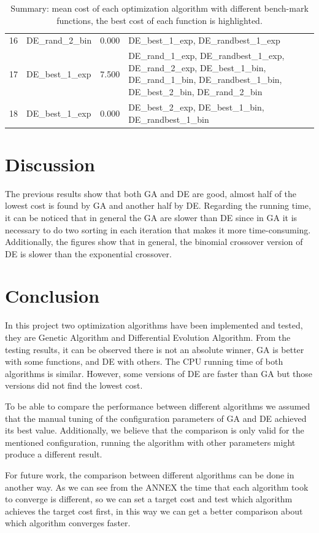 \documentclass[12pt]{article}
\begin{document}
\begin{table}[H]
\begin{tabular}{rlrp{}}
 16 &  DE\_rand\_2\_bin & 0.000 &  DE\_best\_1\_exp, DE\_randbest\_1\_exp \\
 17 &  DE\_best\_1\_exp & 7.500 &  DE\_rand\_1\_exp, DE\_randbest\_1\_exp, DE\_rand\_2\_exp, DE\_best\_1\_bin, DE\_rand\_1\_bin, DE\_randbest\_1\_bin, DE\_best\_2\_bin, DE\_rand\_2\_bin \\
 18 &  DE\_best\_1\_exp & 0.000 &  DE\_best\_2\_exp, DE\_best\_1\_bin, DE\_randbest\_1\_bin \\
\bottomrule
\end{tabular}
\caption{Summary: mean cost of each optimization algorithm with different bench-mark functions, the best cost of each function is highlighted.} 
    \label{tab:summary_best}
\end{table}


\section{Discussion}

The previous results show that both GA and DE are good, almost half of the lowest cost is found by GA and another half by DE. Regarding the running time, it can be noticed that in general the GA are slower than DE since in GA it is necessary to do two sorting in each iteration that makes it more time-consuming. Additionally, the figures show that in general, the binomial crossover version of DE is slower than the exponential crossover.

    \section{Conclusion}
    In this project two optimization algorithms have been implemented and tested, they are Genetic Algorithm and Differential Evolution Algorithm. From the testing results, it can be observed there is not an absolute winner, GA is better with some functions, and DE with others. The CPU running time of both algorithms is similar. However, some versions of DE are faster than GA but those versions did not find the lowest cost.  
 
   To be able to compare the performance between different algorithms we assumed that the manual tuning of the configuration parameters of GA and DE achieved its best value. Additionally, we believe that the comparison is only valid for the mentioned configuration, running the algorithm with other parameters might produce a different result.

For future work, the comparison between different algorithms can be done in another way. As we can see from the ANNEX the time that each algorithm took to converge is different, so we can set a target cost and test which algorithm achieves the target cost first, in this way we can get a better comparison about which algorithm converges faster.
  
    
    
\end{document}
